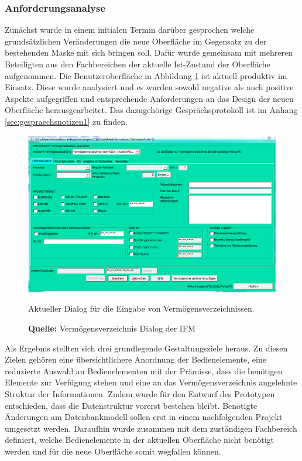 \subsubsection{Anforderungsanalyse}
Zunächst wurde in einem initialen Termin darüber gesprochen welche grundsätzlichen Veränderungen die neue Oberfläche im Gegensatz zu der bestehenden Maske mit sich bringen soll. Dafür wurde gemeinsam mit mehreren Beteiligten aus den Fachbereichen der aktuelle Ist-Zustand der Oberfläche aufgenommen. Die Benutzeroberfläche in Abbildung \ref{fig:aktuellerDialog} ist aktuell produktiv im Einsatz. Diese wurde analysiert und es wurden sowohl negative als auch positive Aspekte aufgegriffen und entsprechende Anforderungen an das Design der neuen Oberfläche herausgearbeitet. Das dazugehörige Gesprächsprotokoll ist im Anhang \ref{sec:gespraechsnotizen1} zu finden.
\begin{figure}[H]
  \centering
  \includegraphics[scale=1]{img/alter_Dialog2.PNG}
  \caption{Aktueller Dialog für die Eingabe von Vermögensverzeichnissen.}
  \caption*{\textbf{Quelle:} Vermögensverzeichnis Dialog der IFM}
  \label{fig:aktuellerDialog}
\end{figure}
Als Ergebnis stellten sich drei grundlegende Gestaltungsziele heraus. Zu diesen Zielen gehören eine übersichtlichere Anordnung der Bedienelemente, eine reduzierte Auswahl an Bedienelementen mit der Prämisse, dass die benötigen Elemente zur Verfügung stehen und eine an das Vermögensverzeichnis angelehnte Struktur der Informationen. Zudem wurde für den Entwurf des Prototypen entschieden, dass die Datenstruktur vorerst bestehen bleibt. Benötigte Änderungen am Datenbankmodell sollen erst in einem nachfolgenden Projekt umgesetzt werden. Daraufhin wurde zusammen mit dem zuständigen Fachbereich definiert, welche Bedienelemente in der aktuellen Oberfläche nicht benötigt werden und für die neue Oberfläche somit wegfallen können.

